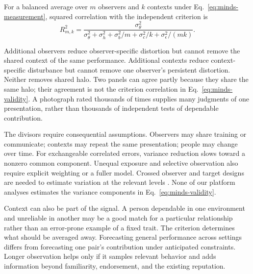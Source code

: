 \begin{proposition}
For a balanced average over $m$ observers and $k$ contexts under Eq.~\eqref{eq:minds-measurement}, squared correlation with the independent criterion is
\begin{equation}
R^2_{m,k}=\frac{\sigma_\theta^2}{\sigma_\theta^2+\sigma_h^2+\sigma_b^2/m+\sigma_c^2/k+\sigma_\epsilon^2/(mk)}.
\label{eq:minds-validity}
\end{equation}
\end{proposition}

Additional observers reduce observer-specific distortion but cannot remove the shared context of the same performance. Additional contexts reduce context-specific disturbance but cannot remove one observer's persistent distortion. Neither removes shared halo. Two panels can agree partly because they share the same halo; their agreement is not the criterion correlation in Eq.~\eqref{eq:minds-validity}. A photograph rated thousands of times supplies many judgments of one presentation, rather than thousands of independent tests of dependable contribution.


The divisors require consequential assumptions. Observers may share training or communicate; contexts may repeat the same presentation; people may change over time. For exchangeable correlated errors, variance reduction slows toward a nonzero common component. Unequal exposure and selective observation also require explicit weighting or a fuller model. Crossed observer and target designs are needed to estimate variation at the relevant levels \citep{judd}. None of our platform analyses estimates the variance components in Eq.~\eqref{eq:minds-validity}.

Context can also be part of the signal. A person dependable in one environment and unreliable in another may be a good match for a particular relationship rather than an error-prone example of a fixed trait. The criterion determines what should be averaged away. Forecasting general performance across settings differs from forecasting one pair's contribution under anticipated constraints. Longer observation helps only if it samples relevant behavior and adds information beyond familiarity, endorsement, and the existing reputation.

